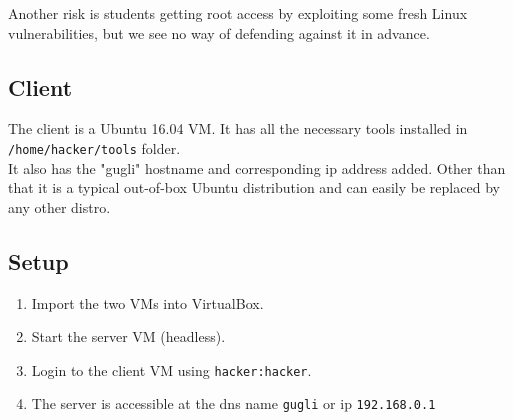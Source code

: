 \documentclass[a4paper]{article}
\begin{document}
  Another risk is students getting root access by exploiting some fresh Linux
  vulnerabilities, but we see no way of defending against it in advance.

\subsection{Client}
  The client is a Ubuntu 16.04 VM. It has all the necessary tools installed in
  \texttt{/home/hacker/tools} folder. \\

  It also has the "gugli" hostname and corresponding ip address added. Other than
  that it is a typical out-of-box Ubuntu distribution and can easily be replaced
  by any other distro.

\subsection{Setup}

\begin{enumerate}
    \item Import the two VMs into VirtualBox.
    \item Start the server VM (headless).
    \item Login to the client VM using \texttt{hacker:hacker}.
    \item The server is accessible at the dns name \texttt{gugli} or ip
      \texttt{192.168.0.1}
\end{enumerate}
\end{document}
